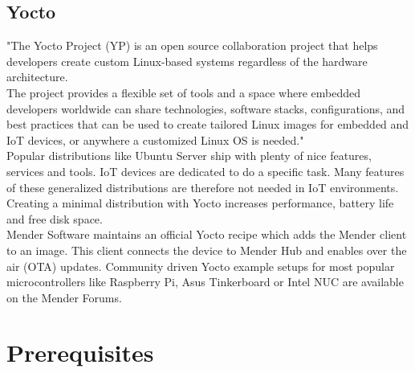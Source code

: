 \subsection{Yocto}
"The Yocto Project (YP) is an open source collaboration project that helps developers create custom Linux-based systems regardless of the hardware architecture.\\
The project provides a flexible set of tools and a space where embedded developers worldwide can share technologies, software stacks, configurations, and best practices that can be used to create tailored Linux images for embedded and IoT devices, or anywhere a customized Linux OS is needed."\cite{yoctoproject}\\
Popular distributions like Ubuntu Server ship with plenty of nice features, services and tools. IoT devices are dedicated to do a specific task. Many features of these generalized distributions are therefore not needed in IoT environments. Creating a minimal distribution with Yocto increases performance, battery life and free disk space.\\
Mender Software maintains an official Yocto recipe which adds the Mender client to an image. This client connects the device to Mender Hub and enables over the air (OTA) updates. Community driven Yocto example setups for most popular microcontrollers like Raspberry Pi, Asus Tinkerboard or Intel NUC are available on the Mender Forums.
\newpage

\section{Prerequisites}
